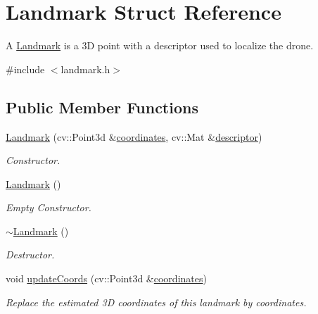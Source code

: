 \hypertarget{structLandmark}{}\section{Landmark Struct Reference}
\label{structLandmark}


A \hyperlink{structLandmark}{Landmark} is a 3D point with a descriptor used to localize the drone.  




{\ttfamily \#include $<$landmark.\+h$>$}

\subsection*{Public Member Functions}
\begin{DoxyCompactItemize}
\item 
\hyperlink{structLandmark_a17dfe0ec5742240823d44deb443c6046}{Landmark} (cv\+::\+Point3d \&\hyperlink{structLandmark_a47a014d563b50c513c914d497638c380}{coordinates}, cv\+::\+Mat \&\hyperlink{structLandmark_a0b3dba38446853398db97517bdc86c0b}{descriptor})
\begin{DoxyCompactList}\small\item\em Constructor. \end{DoxyCompactList}\item 
\mbox{\label{structLandmark_a231bfe6c5d9bc82e63a068be94e5f07e}} 
\hyperlink{structLandmark_a231bfe6c5d9bc82e63a068be94e5f07e}{Landmark} ()
\begin{DoxyCompactList}\small\item\em Empty Constructor. \end{DoxyCompactList}\item 
\mbox{\label{structLandmark_add8b834269cebb84cc638c183ff83208}} 
\hyperlink{structLandmark_add8b834269cebb84cc638c183ff83208}{$\sim$\+Landmark} ()
\begin{DoxyCompactList}\small\item\em Destructor. \end{DoxyCompactList}\item 
\mbox{\label{structLandmark_a13da9a6fac1732732dcf223b629bc2a3}} 
void \hyperlink{structLandmark_a13da9a6fac1732732dcf223b629bc2a3}{update\+Coords} (cv\+::\+Point3d \&\hyperlink{structLandmark_a47a014d563b50c513c914d497638c380}{coordinates})
\begin{DoxyCompactList}\small\item\em Replace the estimated 3D coordinates of this landmark by coordinates. \end{DoxyCompactList}\item 

\end{DoxyCompactItemize}
